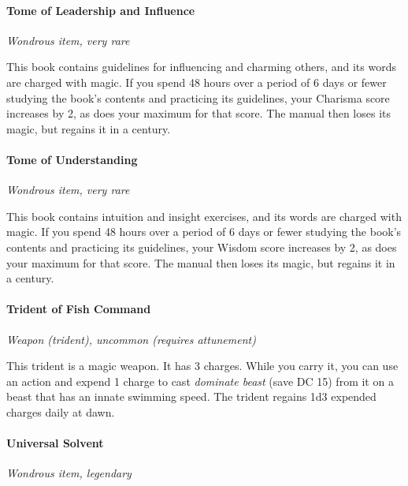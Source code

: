 \documentclass[
]{article}
\begin{document}
\hypertarget{tome-of-leadership-and-influence}{%
\paragraph{Tome of Leadership and
Influence}\label{tome-of-leadership-and-influence}}

\emph{Wondrous item, very rare}

This book contains guidelines for influencing and charming others, and
its words are charged with magic. If you spend 48 hours over a period of
6 days or fewer studying the book's contents and practicing its
guidelines, your Charisma score increases by 2, as does your maximum for
that score. The manual then loses its magic, but regains it in a
century.

\hypertarget{tome-of-understanding}{%
\paragraph{Tome of Understanding}\label{tome-of-understanding}}

\emph{Wondrous item, very rare}

This book contains intuition and insight exercises, and its words are
charged with magic. If you spend 48 hours over a period of 6 days or
fewer studying the book's contents and practicing its guidelines, your
Wisdom score increases by 2, as does your maximum for that score. The
manual then loses its magic, but regains it in a century.

\hypertarget{trident-of-fish-command}{%
\paragraph{Trident of Fish Command}\label{trident-of-fish-command}}

\emph{Weapon (trident), uncommon (requires attunement)}

This trident is a magic weapon. It has 3 charges. While you carry it,
you can use an action and expend 1 charge to cast \emph{dominate beast}
(save DC 15) from it on a beast that has an innate swimming speed. The
trident regains 1d3 expended charges daily at dawn.

\hypertarget{universal-solvent}{%
\paragraph{Universal Solvent}\label{universal-solvent}}

\emph{Wondrous item, legendary}
\end{document}
